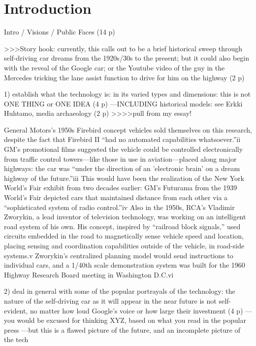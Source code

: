 \chapter{Introduction}
\label{chap:1}

Intro / Visions / Public Faces (14 p)

>>>Story hook: currently, this calls out to be a brief historical
sweep through self-driving car dreams from the 1920s/30s to the
present; but it could also begin with the reveal of the Google car; or
the Youtube video of the guy in the Mercedes tricking the lane assist
function to drive for him on the highway (2 p)

1) establish what the technology is: in its varied types and
dimensions: this is not ONE THING or ONE IDEA (4 p)
---INCLUDING historical models: see Erkki Huhtamo, media archaeology
(2 p)
>>>>pull from my essay!

General Motors's 1950s Firebird concept
vehicles sold themselves on this research, despite the fact that
Firebird II “had no automated capabilities whatsoever.”ii GM's
promotional films suggested the vehicle could be controlled
electronically from traffic control towers—like those in use in
aviation—placed along major highways: the car was “under the direction
of an 'electronic brain' on a dream highway of the future.”iii This
would have been the realization of the New York World's Fair exhibit
from two decades earlier: GM's Futurama from the 1939 World's Fair
depicted cars that maintained distance from each other via a
“sophisticated system of radio control.”iv Also in the 1950s, RCA's
Vladimir Zworykin, a lead inventor of television technology, was
working on an intelligent road system of his own. His concept,
inspired by “railroad block signals,” used circuits embedded in the
road to magnetically sense vehicle speed and location, placing sensing
and coordination capabilities outside of the vehicle, in road-side
systems.v Zworykin's centralized planning model would send
instructions to individual cars, and a 1/40th scale demonstration
system was built for the 1960 Highway Research Board meeting in
Washington D.C.vi


2) deal in general with some of the popular portrayals of the
technology: the nature of the self-driving car as it will appear in
the near future is not self-evident, no matter how loud Google's voice
or how large their investment (4 p)
---you would be excused for thinking XYZ, based on what you read in
the popular press
---but this is a flawed picture of the future, and an incomplete
picture of the tech

